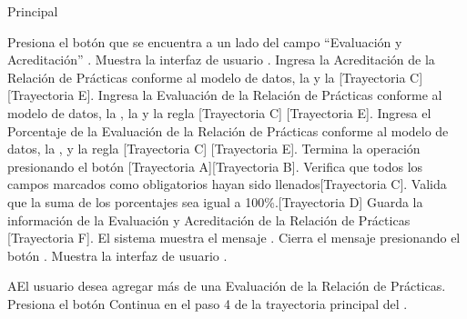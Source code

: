 \begin{UCtrayectoria}{Principal}

\UCpaso[\UCactor] Presiona el botón \BtnModal que se encuentra a un lado del campo ``Evaluación y Acreditación'' .
\UCpaso Muestra la interfaz de usuario .
\UCpaso[\UCactor] Ingresa la Acreditación de la Relación de Prácticas conforme al modelo de datos, la  y la  [Trayectoria C] [Trayectoria E].
\UCpaso[\UCactor] Ingresa la Evaluación de la Relación de Prácticas conforme al modelo de datos, la , la  y la regla  [Trayectoria C] [Trayectoria E].
\UCpaso[\UCactor] Ingresa el Porcentaje de la Evaluación de la Relación de Prácticas conforme al modelo de datos, la ,  y la regla  [Trayectoria C] [Trayectoria E].
\UCpaso[\UCactor] Termina la operación presionando el botón  [Trayectoria A][Trayectoria B].
\UCpaso Verifica que todos los campos marcados como obligatorios hayan sido llenados[Trayectoria C].
\UCpaso Valida que la suma de los porcentajes sea igual a 100\%.[Trayectoria D]
\UCpaso Guarda la información de la Evaluación y Acreditación de la Relación de Prácticas [Trayectoria F].
\UCpaso El sistema muestra el mensaje .
\UCpaso[\UCactor] Cierra el mensaje presionando el botón . 
\UCpaso Muestra la interfaz de usuario  .
\end{UCtrayectoria}

\begin{UCtrayectoriaA}{A}{El usuario desea agregar más de una Evaluación de la Relación de Prácticas.}
\UCpaso[\UCactor] Presiona el botón 
\UCpaso Continua en el paso 4 de la trayectoria principal del .

\end{UCtrayectoriaA}

